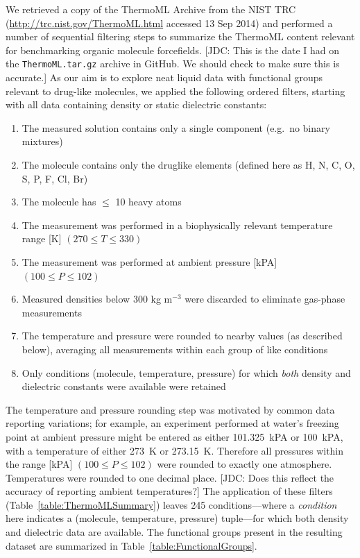 \documentclass[aps,pre,twocolumn,nofootinbib,superscriptaddress,linenumbers]{revtex4-1}
\begin{document}
We retrieved a copy of the ThermoML Archive from the NIST TRC (\url{http://trc.nist.gov/ThermoML.html} accessed 13 Sep 2014) and performed a number of sequential filtering steps to summarize the ThermoML content relevant for benchmarking organic molecule forcefields.  
{\color{red}[JDC: This is the date I had on the {\tt ThermoML.tar.gz} archive in GitHub. We should check to make sure this is accurate.]}
As our aim is to explore neat liquid data with functional groups relevant to drug-like molecules, we applied the following ordered filters, starting with all data containing density or static dielectric constants: 
\begin{enumerate}
 \item The measured solution contains only a single component (e.g.~no binary mixtures)
 \item The molecule contains only the druglike elements (defined here as H, N, C, O, S, P, F, Cl, Br)
 \item The molecule has $\le$ 10 heavy atoms
 \item The measurement was performed in a biophysically relevant temperature range [K] $(270 \le T \le 330)$
 \item The measurement was performed at ambient pressure [kPA] $(100 \le P \le 102)$
 \item Measured densities below 300 kg m$^{-3}$ were discarded to eliminate gas-phase measurements
 \item The temperature and pressure were rounded to nearby values (as described below), averaging all measurements within each group of like conditions
 \item Only conditions (molecule, temperature, pressure) for which \emph{both} density and dielectric constants were available were retained
\end{enumerate}
The temperature and pressure rounding step was motivated by common data reporting variations; for example, an experiment performed at water's freezing point at ambient pressure might be entered as either 101.325~kPA or 100~kPA, with a temperature of either 273~K or 273.15~K.  
Therefore all pressures within the range [kPA] $(100 \le P \le 102)$ were rounded to exactly one atmosphere.  
Temperatures were rounded to one decimal place. {\color{red}[JDC: Does this reflect the accuracy of reporting ambient temperatures?]}
The application of these filters (Table~\ref{table:ThermoMLSummary}) leaves 245 conditions---where a \emph{condition} here indicates a (molecule, temperature, pressure) tuple---for which both density and dielectric data are available.  
The functional groups present in the resulting dataset are summarized in Table~\ref{table:FunctionalGroups}.  
\end{document}
